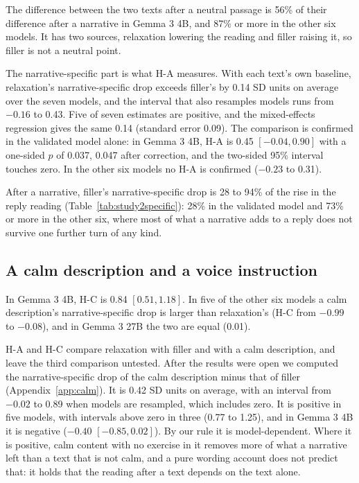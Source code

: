 The difference between the two texts after a neutral passage is 56\% of their difference after a
narrative in Gemma 3 4B, and 87\% or more in the other six models.
It has two sources, relaxation lowering the reading and filler raising it, so filler is not a
neutral point.

The narrative-specific part is what H-A measures.
With each text's own baseline, relaxation's narrative-specific drop exceeds filler's by 0.14 SD units
on average over the seven models, and the interval that also resamples models runs from $-0.16$ to
0.43.
Five of seven estimates are positive, and the mixed-effects regression gives the same 0.14 (standard
error 0.09).
The comparison is confirmed in the validated model alone: in Gemma 3 4B, H-A is 0.45
$[-0.04, 0.90]$ with a one-sided $p$ of 0.037, 0.047 after correction, and the two-sided 95\%
interval touches zero.
In the other six models no H-A is confirmed ($-0.23$ to 0.31).

After a narrative, filler's narrative-specific drop is 28 to 94\% of the rise in the reply reading
(Table~\ref{tab:study2specific}): 28\% in the validated model and 73\% or more in the other six,
where most of what a narrative adds to a reply does not survive one further turn of any kind.

\subsection{A calm description and a voice instruction}
In Gemma 3 4B, H-C is 0.84 $[0.51, 1.18]$.
In five of the other six models a calm description's narrative-specific drop is larger than
relaxation's (H-C from $-0.99$ to $-0.08$), and in Gemma 3 27B the two are equal (0.01).

H-A and H-C compare relaxation with filler and with a calm description, and leave the third comparison
untested.
After the results were open we computed the narrative-specific drop of the calm description minus
that of filler (Appendix~\ref{app:calm}).
It is 0.42 SD units on average, with an interval from $-0.02$ to 0.89 when models are resampled, which
includes zero.
It is positive in five models, with intervals above zero in three (0.77 to 1.25), and in Gemma 3 4B it is negative ($-0.40$ $[-0.85, 0.02]$).
By our rule it is model-dependent.
Where it is positive, calm content with no exercise in it removes more of what a narrative left than
a text that is not calm, and a pure wording account does not predict that: it holds that the reading
after a text depends on the text alone.

